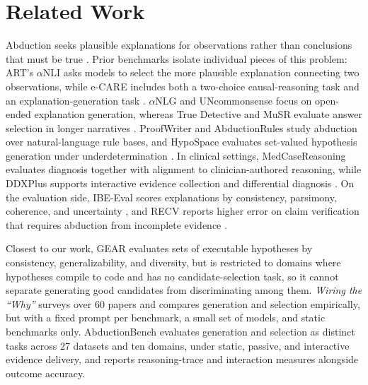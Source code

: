 \section{Related Work}
\label{sec:related_work}

Abduction seeks plausible explanations for observations rather than conclusions that must be true \citep{schurz2008patterns}. Prior benchmarks isolate individual pieces of this problem: ART's $\alpha$NLI asks models to select the more plausible explanation connecting two observations, while e-CARE includes both a two-choice causal-reasoning task and an explanation-generation task \citep{Bhagavatula2020Abductive,du2022ecare}. $\alpha$NLG and UNcommonsense focus on open-ended explanation generation, whereas True Detective and MuSR evaluate answer selection in longer narratives \citep{impl_zhao2023uncommonsense,del2022truedetective,sprague2024musr}. ProofWriter and AbductionRules study abduction over natural-language rule bases, and HypoSpace evaluates set-valued hypothesis generation under underdetermination \citep{impl_tafjord2020proofwriter,young2022abductionrules,chen2026hypospace}. In clinical settings, MedCaseReasoning evaluates diagnosis together with alignment to clinician-authored reasoning, while DDXPlus supports interactive evidence collection and differential diagnosis \citep{wu2025medcasereasoning,fansitchango2022ddxplus}. On the evaluation side, IBE-Eval scores explanations by consistency, parsimony, coherence, and uncertainty \citep{dalal2024ibe}, and RECV reports higher error on claim verification that requires abduction from incomplete evidence \citep{dougrezlewis2024recv}.

Closest to our work, GEAR \citep{impl_he2025gear} evaluates sets of executable hypotheses by consistency, generalizability, and diversity, but is restricted to domains where hypotheses compile to code and has no candidate-selection task, so it cannot separate generating good candidates from discriminating among them. \emph{Wiring the ``Why''} \citep{salimi2026wiring} surveys over 60 papers and compares generation and selection empirically, but with a fixed prompt per benchmark, a small set of models, and static benchmarks only. AbductionBench evaluates generation and selection as distinct tasks across 27 datasets and ten domains, under static, passive, and interactive evidence delivery, and reports reasoning-trace and interaction measures alongside outcome accuracy.

